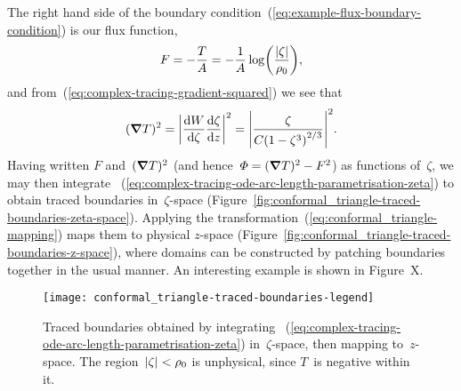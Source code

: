 The right hand side
of the boundary condition~(\ref{eq:example-flux-boundary-condition})
is our flux function,
\begin{equation}
  F = -\frac{T}{A} = -\frac{1}{A} \log \roundbr*{\frac{\abs{\zeta}}{\rho_0}},
  \label{eq:conformal_triangle-flux-function}
\end{equation}
and from~(\ref{eq:complex-tracing-gradient-squared})
we see that
\begin{equation}
  (\del T)^2
    = \abs*{\tder{W}{\zeta} \tder{\zeta}{z}}^2
    = \abs*{\frac{\zeta}{C \roundbr*{1 - \zeta^3}^{2/3}}}^2.
  \label{eq:conformal_triangle-gradient-squared}
\end{equation}
Having written $F$ and~$(\mathop{}\!\boldsymbol{\mathbf{\nabla}} T)^2$
(and hence~$\varPhi = (\mathop{}\!\boldsymbol{\mathbf{\nabla}} T)^2 - F^2$)
as functions of~$\zeta$,
we may then integrate~%
  (\ref{eq:complex-tracing-ode-arc-length-parametrisation-zeta})
to obtain traced boundaries in~$\zeta$-space
(Figure~\ref{fig:conformal_triangle-traced-boundaries-zeta-space}).
Applying the transformation~(\ref{eq:conformal_triangle-mapping})
maps them to physical $z$-space
(Figure~\ref{fig:conformal_triangle-traced-boundaries-z-space}),
where domains can be constructed
by patching boundaries together in the usual manner.
An interesting example is shown in Figure~X\@. %

\begin{figure}
  \newcommand*{\subfigurewidth}{0.47\textwidth}
  \texttt{[image: conformal\_triangle-traced-boundaries-legend]}
  \begin{subfigure}[t]{\subfigurewidth}
  \end{subfigure}
    \hfill
  \begin{subfigure}[t]{\subfigurewidth}
  \end{subfigure}
  \caption{
    Traced boundaries obtained by integrating~%
      (\ref{eq:complex-tracing-ode-arc-length-parametrisation-zeta})
    in~$\zeta$-space,
    then mapping to~$z$-space.
    The region~$\lvert\zeta\rvert < \rho_0$ is unphysical,
    since $T$~is negative within it.
  }
  \label{fig:conformal_triangle-traced-boundaries}
\end{figure}
